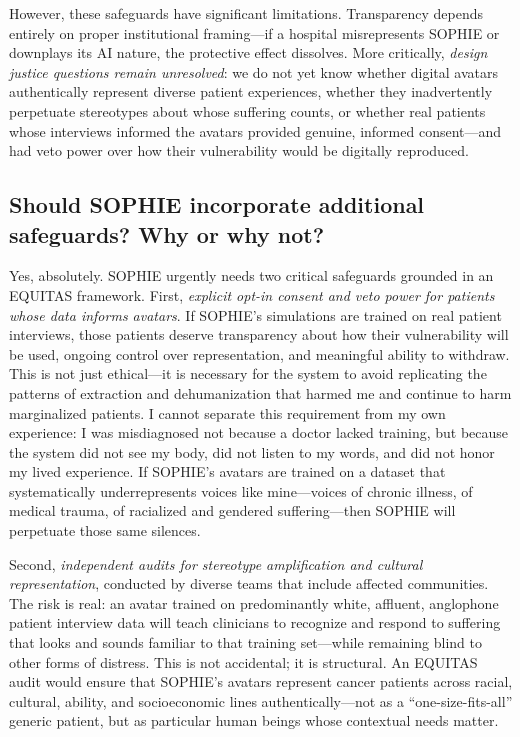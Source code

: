 \documentclass[12pt,twoside]{article}
\begin{document}
However, these safeguards have significant limitations. Transparency depends entirely on proper institutional framing—if a hospital misrepresents SOPHIE or downplays its AI nature, the protective effect dissolves. More critically, \emph{design justice questions remain unresolved}: we do not yet know whether digital avatars authentically represent diverse patient experiences, whether they inadvertently perpetuate stereotypes about whose suffering counts, or whether real patients whose interviews informed the avatars provided genuine, informed consent—and had veto power over how their vulnerability would be digitally reproduced.

\subsection*{Should SOPHIE incorporate additional safeguards? Why or why not?}

Yes, absolutely. SOPHIE urgently needs two critical safeguards grounded in an EQUITAS framework. First, \emph{explicit opt-in consent and veto power for patients whose data informs avatars}. If SOPHIE's simulations are trained on real patient interviews, those patients deserve transparency about how their vulnerability will be used, ongoing control over representation, and meaningful ability to withdraw. This is not just ethical—it is necessary for the system to avoid replicating the patterns of extraction and dehumanization that harmed me and continue to harm marginalized patients. I cannot separate this requirement from my own experience: I was misdiagnosed not because a doctor lacked training, but because the system did not see my body, did not listen to my words, and did not honor my lived experience. If SOPHIE's avatars are trained on a dataset that systematically underrepresents voices like mine—voices of chronic illness, of medical trauma, of racialized and gendered suffering—then SOPHIE will perpetuate those same silences.

Second, \emph{independent audits for stereotype amplification and cultural representation}, conducted by diverse teams that include affected communities. The risk is real: an avatar trained on predominantly white, affluent, anglophone patient interview data will teach clinicians to recognize and respond to suffering that looks and sounds familiar to that training set—while remaining blind to other forms of distress. This is not accidental; it is structural. An EQUITAS audit would ensure that SOPHIE's avatars represent cancer patients across racial, cultural, ability, and socioeconomic lines authentically—not as a \enquote{one-size-fits-all} generic patient, but as particular human beings whose contextual needs matter.
\end{document}
